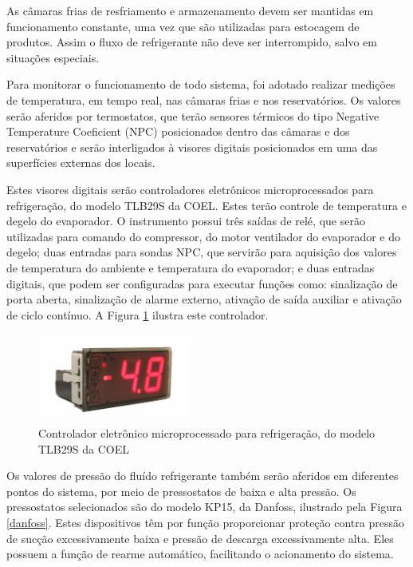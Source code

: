 \documentclass[10pt,a4paper]{article}
\begin{document}
As câmaras frias de resfriamento e armazenamento devem ser mantidas em funcionamento constante, uma vez que são utilizadas para estocagem de produtos. Assim o fluxo de refrigerante não deve ser interrompido, salvo em situações especiais. 

Para monitorar o funcionamento de todo sistema, foi adotado realizar medições de temperatura, em tempo real, nas câmaras frias e nos reservatórios. Os valores serão aferidos por termostatos, que terão sensores térmicos do tipo Negative Temperature Coeficient (NPC) posicionados dentro das câmaras e dos reservatórios  e serão interligados à visores digitais posicionados em uma das superfícies externas dos locais. 

Estes visores digitais serão controladores eletrônicos microprocessados para refrigeração, do modelo TLB29S da COEL. Estes terão controle de temperatura e degelo do evaporador. O instrumento possui três saídas de relé, que serão utilizadas para comando do compressor, do motor ventilador do evaporador e do degelo; duas entradas para sondas NPC, que servirão para aquisição dos valores de temperatura do ambiente e temperatura do evaporador; e duas entradas digitais, que podem ser configuradas para executar funções como: sinalização de porta aberta, sinalização de alarme externo, ativação de saída auxiliar e ativação de ciclo contínuo. A Figura \ref{coel} ilustra este controlador.

\begin{figure}[h!]
    \centering
    \includegraphics[width=5cm]{Figuras/coel.jpg}
    \caption{Controlador eletrônico microprocessado para refrigeração, do modelo TLB29S da COEL}
    \label{coel}
\end{figure}

Os valores de pressão do fluído refrigerante também serão aferidos em diferentes pontos do sistema, por meio de pressostatos de baixa e alta pressão. Os pressostatos selecionados são do modelo KP15, da Danfoss, ilustrado pela Figura \ref{danfoss}. Estes dispositivos têm por função proporcionar proteção contra pressão de sucção excessivamente baixa e pressão de descarga excessivamente alta. Eles possuem a função de rearme automático, facilitando o acionamento do sistema.
\end{document}
